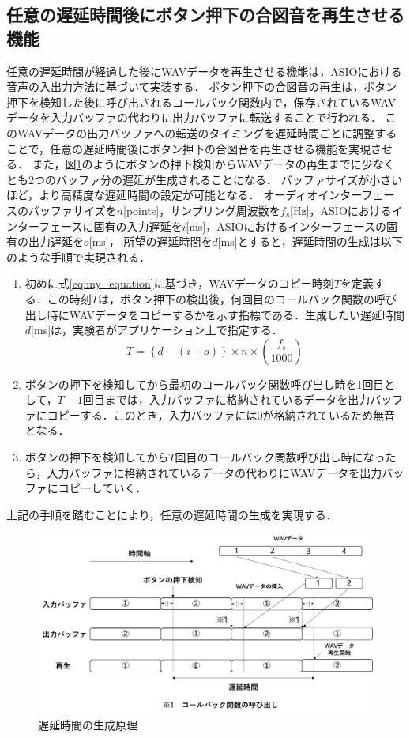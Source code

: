 \subsection{任意の遅延時間後にボタン押下の合図音を再生させる機能}
任意の遅延時間が経過した後にWAVデータを再生させる機能は，ASIOにおける音声の入出力方法に基づいて実装する．
ボタン押下の合図音の再生は，ボタン押下を検知した後に呼び出されるコールバック関数内で，保存されているWAVデータを入力バッファの代わりに出力バッファに転送することで行われる．
このWAVデータの出力バッファへの転送のタイミングを遅延時間ごとに調整することで，任意の遅延時間後にボタン押下の合図音を再生させる機能を実現させる．
また，図\ref{fig:delay_theory}のようにボタンの押下検知からWAVデータの再生までに少なくとも2つのバッファ分の遅延が生成されることになる．
バッファサイズが小さいほど，より高精度な遅延時間の設定が可能となる．
オーディオインターフェースのバッファサイズを$n$[points]，サンプリング周波数を$f_{s}$[Hz]，ASIOにおけるインターフェースに固有の入力遅延を$i$[ms]，ASIOにおけるインターフェースの固有の出力遅延を$o$[ms]，
所望の遅延時間を$d$[ms]とすると，遅延時間の生成は以下のような手順で実現される．
\begin{enumerate}[leftmargin=*]
  \item 初めに式\ref{eq:my_equation}に基づき，WAVデータのコピー時刻$T$を定義する．この時刻$T$は，ボタン押下の検出後，何回目のコールバック関数の呼び出し時にWAVデータをコピーするかを示す指標である．生成したい遅延時間$d$[ms]は，実験者がアプリケーション上で指定する．
\begin{equation}
T = \left\{ d - (i + o) \right\} \times n \times \left( \frac{f_s}{1000} \right) \label{eq:my_equation}
\end{equation}

  \item ボタンの押下を検知してから最初のコールバック関数呼び出し時を1回目として，$T-1$回目までは，入力バッファに格納されているデータを出力バッファにコピーする．このとき，入力バッファには0が格納されているため無音となる．
  \item ボタンの押下を検知してから$T$回目のコールバック関数呼び出し時になったら，入力バッファに格納されているデータの代わりにWAVデータを出力バッファにコピーしていく．
\end{enumerate}
上記の手順を踏むことにより，任意の遅延時間の生成を実現する．
\begin{figure}[h]
  \centering
  \includegraphics[scale=0.12]{figures/System/Delay_theory.pdf}
  \caption{遅延時間の生成原理}
  \label{fig:delay_theory}
\end{figure}
